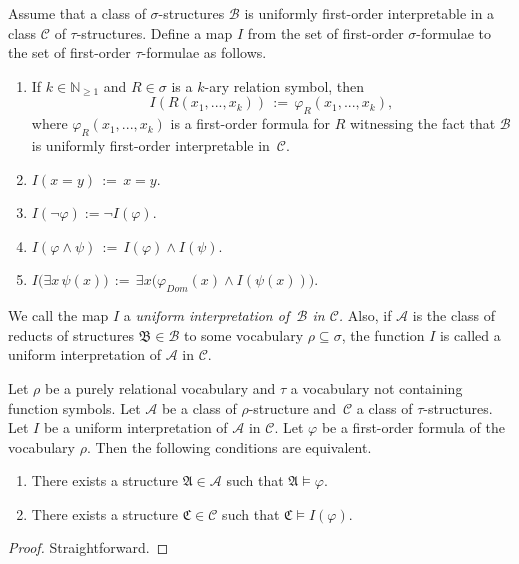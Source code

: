 \documentclass{LMCS}
\theoremstyle{plain}
\newcommand{\mf}{\mathfrak}
\newcommand{\mi}{\mathit}
\begin{document}
Assume that a class of $\sigma$-structures $\mathcal{B}$ is uniformly first-order interpretable in a class $\mathcal{C}$ of $\tau$-structures.
%
Define a map $I$ from the set of first-order $\sigma$-formulae to
%
the set of first-order $\tau$-formulae as follows. 
%



%
\begin{enumerate}
%
%
\item
If $k\in\mathbb{N}_{\geq 1}$ and $R\in\sigma$ is a $k$-ary relation symbol,
%
then
%
%
%
$$I(R(x_1,...,x_k))\, :=\, \varphi_{R}(x_1,...,x_k),$$
%
%
%
where $\varphi_{R}(x_1,...,x_k)$ is a first-order formula for $R$ witnessing the
%
fact that $\mathcal{B}$ is uniformly first-order 
%
interpretable in\, $\mathcal{C}$.
%
\item
$I(x=y)\, :=\, x=y$.
%
\item
$I(\neg\varphi):=\neg I(\varphi)$.
\item
$I(\varphi\wedge\psi)\, :=\, I(\varphi)\wedge I(\psi)$.
%
\item
$I\bigl(\exists x\, \psi(x)\bigr)\, :=\, \exists x\bigl(\varphi_{\mi{Dom}}(x)\wedge I(\psi(x))\bigr).$
%   
\end{enumerate}
%


%
We call the map $I$ a \emph{uniform interpretation of\, $\mathcal{B}$ in $\mathcal{C}$.}
%
Also, if $\mathcal{A}$ is the class of reducts of structures $\mf{B}\in\mathcal{B}$ to some
%
vocabulary $\rho\subseteq\sigma$, the function $I$ is called a uniform interpretation of $\mathcal{A}$ in $\mathcal{C}$.
%
%
%



%
\begin{lem}\label{uniforminterpretationlemma}
%
Let $\rho$ be a purely relational vocabulary and $\tau$ a vocabulary 
%
not containing function symbols. Let $\mathcal{A}$ be a class of $\rho$-structure
%
and\, $\mathcal{C}$ a class of $\tau$-structures. 
%
Let $I$ be a uniform interpretation of $\mathcal{A}$ in $\mathcal{C}$.
%
Let $\varphi$ be a first-order formula of the vocabulary $\rho$.
%
Then the following conditions are equivalent.
%
%
%
\begin{enumerate}
%
\item
There exists a structure $\mf{A}\in\mathcal{A}$ such
%
that $\mf{A}\models \varphi$.
%
\item
There exists a structure $\mf{C}\in\mathcal{C}$ such that 
%
$\mf{C}\models I(\varphi)$.
%
%
%
\end{enumerate}
%
%
%
\end{lem}
%
%
%
\begin{proof}
%
Straightforward.
%
\end{proof}
%
\end{document}
